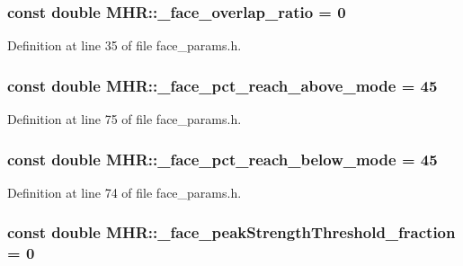 \hypertarget{namespace_m_h_r_ab6430d316d9d82ce08b7d35fda6ba14e}{
\subsubsection[{\+\_\+face\+\_\+overlap\+\_\+ratio}]{\setlength{\rightskip}{0pt plus 5cm}const double M\+H\+R\+::\+\_\+face\+\_\+overlap\+\_\+ratio = 0}}\label{namespace_m_h_r_ab6430d316d9d82ce08b7d35fda6ba14e}


Definition at line 35 of file face\+\_\+params.\+h.

\hypertarget{namespace_m_h_r_a50b60319fb33591915a63ce9b618a18c}{
\subsubsection[{\+\_\+face\+\_\+pct\+\_\+reach\+\_\+above\+\_\+mode}]{\setlength{\rightskip}{0pt plus 5cm}const double M\+H\+R\+::\+\_\+face\+\_\+pct\+\_\+reach\+\_\+above\+\_\+mode = 45}}\label{namespace_m_h_r_a50b60319fb33591915a63ce9b618a18c}


Definition at line 75 of file face\+\_\+params.\+h.

\hypertarget{namespace_m_h_r_ac4235bc51ec51e261f5822920a5886b0}{
\subsubsection[{\+\_\+face\+\_\+pct\+\_\+reach\+\_\+below\+\_\+mode}]{\setlength{\rightskip}{0pt plus 5cm}const double M\+H\+R\+::\+\_\+face\+\_\+pct\+\_\+reach\+\_\+below\+\_\+mode = 45}}\label{namespace_m_h_r_ac4235bc51ec51e261f5822920a5886b0}


Definition at line 74 of file face\+\_\+params.\+h.

\hypertarget{namespace_m_h_r_adad3be408f5b45234ee745acc33d6ac8}{
\subsubsection[{\+\_\+face\+\_\+peak\+Strength\+Threshold\+\_\+fraction}]{\setlength{\rightskip}{0pt plus 5cm}const double M\+H\+R\+::\+\_\+face\+\_\+peak\+Strength\+Threshold\+\_\+fraction = 0}}\label{namespace_m_h_r_adad3be408f5b45234ee745acc33d6ac8}


